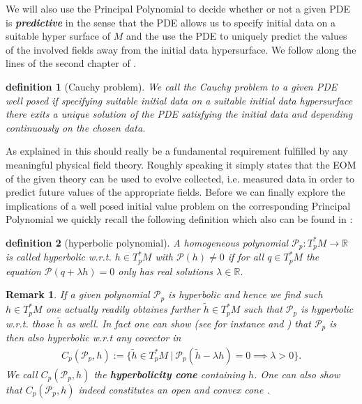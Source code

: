 \documentclass[a4paper,12pt, DIV=14, BCOR=5mm, twoside, headsepline, numbers=noenddot]{scrbook}
\newtheorem{definition}{definition}[section]
\newtheorem*{remark}{Remark}
\begin{document}
We will also use the Principal Polynomial to decide whether or not a given PDE is \textit{\textbf{predictive}} in the sense that the PDE allows us to specify initial data on a suitable hyper surface of $M$ and the use the PDE to uniquely predict the values of the involved fields away from the initial data hypersurface. We follow along the lines of the second chapter of \cite{Rivera}.
\begin{definition}[Cauchy problem]
We call the Cauchy problem to a given PDE well posed if specifying suitable initial data on a suitable initial data hypersurface there exits a unique solution of the PDE satisfying the initial data and depending continuously on the chosen data.  
\end{definition}
As explained in \cite{Rivera} this should really be a fundamental requirement fulfilled by any meaningful physical field theory. Roughly speaking it simply states that the EOM of the given theory can be used to evolve collected, i.e. measured data in order to predict future values of the appropriate fields.
Before we can finally explore the implications of a well posed initial value problem on the corresponding Principal Polynomial we quickly recall the following definition which also can be found in \cite{Rivera}:
\begin{definition}[hyperbolic polynomial]
A homogeneous polynomial $\mathcal{P}_p : T_p^{\ast}M \rightarrow \mathbb{R}$ is called hyperbolic w.r.t. $h\in T_p^{\ast}M$ with $\mathcal{P}(h) \neq 0$ if for all $q\in T_p^{\ast}M$ the equation $\mathcal{P}(q + \lambda h)=0$ only has real solutions $\lambda \in \mathbb{R}$.
\end{definition}
\begin{remark}
If a given polynomial $\mathcal{P}_p$ is hyperbolic and hence we find such $h\in T^{\ast}_pM$ one actually readily obtaines further $\tilde{h}\in T^{\ast}_pM$ such that $\mathcal{P}_p$ is hyperbolic w.r.t. those $\tilde{h}$ as well. In fact one can show (see for instance \cite{Rivera} and \cite{10.2307/24900665}) that $\mathcal{P}_p$ is then also hyperbolic w.r.t any covector in 
\begin{align}
    C_p(\mathcal{P}_p,h) := \{ \tilde{h} \in T_p^{\ast}M \ \vert \ \mathcal{P}_p(\tilde{h}- \lambda h) = 0 \implies \lambda > 0\}.
\end{align}
We call $C_p(\mathcal{P}_p,h)$ the \textbf{\textit{hyperbolicity cone}} containing $h$. One can also show that $C_p(\mathcal{P}_p,h)$ indeed constitutes an open and convex cone \cite{10.2307/24900665}.
\end{remark}
\end{document}
